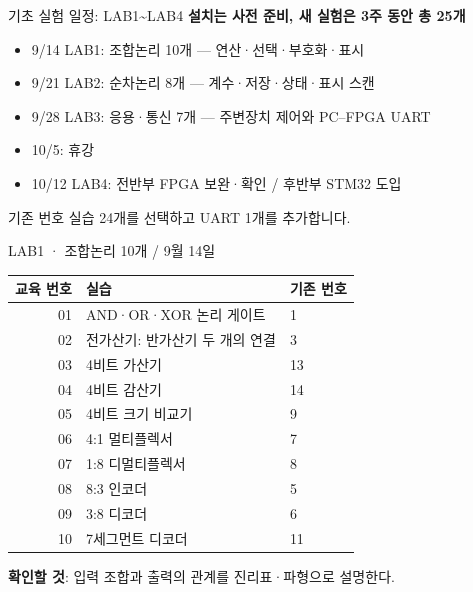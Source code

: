 \documentclass[aspectratio=169,11pt,t]{beamer}
\begin{document}
\begin{frame}{기초 실험 일정: LAB1\textasciitilde{}LAB4}
\textbf{설치는 사전 준비, 새 실험은 3주 동안 총 25개}
\vspace{0.25cm}
\begin{itemize}
\item 9/14 LAB1: 조합논리 10개 --- 연산·선택·부호화·표시
\item 9/21 LAB2: 순차논리 8개 --- 계수·저장·상태·표시 스캔
\item 9/28 LAB3: 응용·통신 7개 --- 주변장치 제어와 PC--FPGA UART
\item 10/5: 휴강
\item 10/12 LAB4: 전반부 FPGA 보완·확인 / 후반부 STM32 도입
\end{itemize}
\vspace{0.2cm}
기존 번호 실습 24개를 선택하고 UART 1개를 추가합니다.
\end{frame}

\begin{frame}{LAB1 · 조합논리 10개 / 9월 14일}
\small
\begin{tabular}{rll}
\textbf{교육 번호} & \textbf{실습} & \textbf{기존 번호}\\\hline
01 & AND·OR·XOR 논리 게이트 & 1\\
02 & 전가산기: 반가산기 두 개의 연결 & 3\\
03 & 4비트 가산기 & 13\\
04 & 4비트 감산기 & 14\\
05 & 4비트 크기 비교기 & 9\\
06 & 4:1 멀티플렉서 & 7\\
07 & 1:8 디멀티플렉서 & 8\\
08 & 8:3 인코더 & 5\\
09 & 3:8 디코더 & 6\\
10 & 7세그먼트 디코더 & 11
\end{tabular}
\vspace{0.2cm}\par
\textbf{확인할 것}: 입력 조합과 출력의 관계를 진리표·파형으로 설명한다.
\end{frame}
\end{document}

